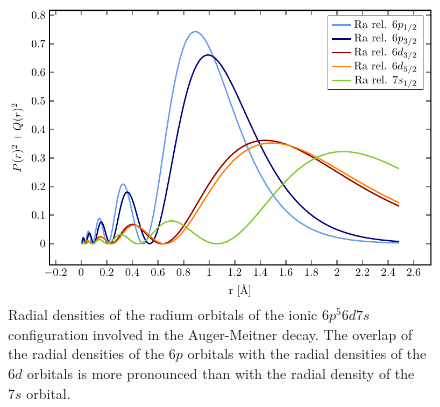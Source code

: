 \begin{figure}[h]
 \centering
 \includegraphics[width=\columnwidth]{pics/ra_6d_R.pdf}
 \caption{Radial densities of the radium orbitals of the ionic $6p^5 6d 7s$
          configuration involved in the Auger-Meitner decay. The overlap of the radial
          densities of the $6p$ orbitals with the radial densities of the $6d$ orbitals
          is more pronounced than with the radial density of the $7s$ orbital.}
 \label{fig:radial_ra}
\end{figure}

